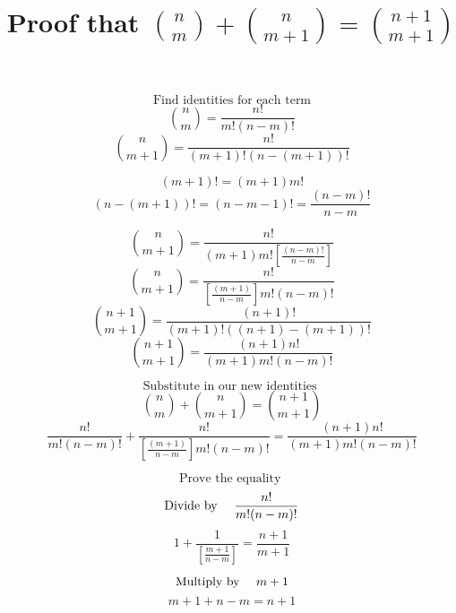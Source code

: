 \documentclass[11pt,fleqn,a4paper,leqno]{article}
\begin{document}
\title{Proof that \( \binom{n}{m} + \binom{n}{m + 1} = \binom{n + 1}{m + 1} \) }
\date{}
\maketitle

\[ \text{Find identities for each term} \]
\begin{equation}
\binom{n}{m} = \frac{n!}{m!(n - m)!} 
\end{equation}
\begin{equation}
\binom{n}{m + 1} = \frac{n!}{(m + 1)!(n - (m + 1))!}
\end{equation}
  
\[ (m+1)! = (m + 1)m! \]
\[ (n - (m + 1))! = (n - m - 1)! = \frac{(n - m)!}{n - m} \]

\begin{equation}
\binom{n}{m + 1} = \frac{n!}{(m + 1)m!\left[\frac{(n - m)!}{n -m }\right]}
\end{equation}
\begin{equation}
\binom{n}{m + 1} = \frac{n!}{\left[\frac{(m + 1)}{n -m }\right]m!(n - m)!}
\end{equation}
\begin{equation}
\binom{n + 1}{m + 1} = \frac{(n + 1)!}{(m+1)!((n + 1) - (m + 1))!}
\end{equation}
\begin{equation}
\binom{n + 1}{m + 1} = \frac{(n + 1)n!}{(m + 1)m!(n - m)!}
\end{equation}

\[ \text{Substitute in our new identities } \]
\[ \binom{n}{m} + \binom{n}{m + 1} = \binom{n + 1}{m + 1} \]
\begin{equation}
\frac{n!}{m!(n - m)!} + \frac{n!}{\left[\frac{(m + 1)}{n -m }\right]m!(n - m)!} = 
\frac{(n + 1)n!}{(m + 1)m!(n - m)!}
\end{equation}

\[ \text{Prove the equality } \]
\[ \text{Divide by \quad} \frac{n!}{m!(n - m)!} \]
\begin{equation}
1 + \frac{1}{\left[\frac{m + 1}{n - m}\right]} = \frac{n + 1}{m + 1}
\end{equation}

\[ \text{Multiply by \quad} m + 1 \]
\begin{equation}
m +1 + n -m = n + 1
\end{equation}
\end{document}
